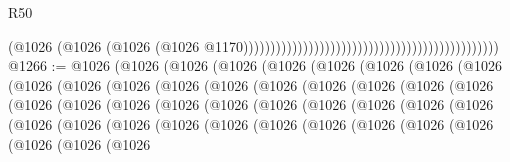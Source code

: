 \begin{lexlean}{R50}
\begin{coremodule}
                                                                                          (@1026
                                                                                            (@1026
                                                                                              (@1026
                                                                                                (@1026
                                                                                                  @1170)))))))))))))))))))))))))))))))))))))))))))))))
@1266 := @1026
    (@1026
      (@1026
        (@1026
          (@1026
            (@1026
              (@1026
                (@1026
                  (@1026
                    (@1026
                      (@1026
                        (@1026
                          (@1026
                            (@1026
                              (@1026
                                (@1026
                                  (@1026
                                    (@1026
                                      (@1026
                                        (@1026
                                          (@1026
                                            (@1026
                                              (@1026
                                                (@1026
                                                  (@1026
                                                    (@1026
                                                      (@1026
                                                        (@1026
                                                          (@1026
                                                            (@1026
                                                              (@1026
                                                                (@1026
                                                                  (@1026
                                                                    (@1026
                                                                      (@1026
                                                                        (@1026
                                                                          (@1026
                                                                            (@1026
                                                                              (@1026
                                                                                (@1026
                                                                                  (@1026
                                                                                    (@1026

\end{coremodule}
\end{lexlean}
